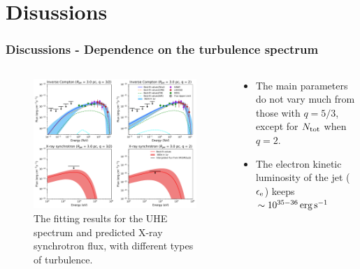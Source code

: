 \documentclass[10pt,aspectratio=169,mathserif]{beamer}
\begin{document}

\section{Disussions}
\begin{frame}
  \frametitle{Discussions - Dependence on the turbulence spectrum}
\begin{columns}[T] %
    \begin{column}{0.5\textwidth} 
      \begin{figure}
        \includegraphics[width=\textwidth]{SYNIC_all_HESS_flat_q=1.pdf}
        \caption{The fitting results for the UHE spectrum and predicted X-ray synchrotron flux, with different types of turbulence.}
        \label{fig:confine}
      \end{figure}
    \end{column}

    \begin{column}{0.5\textwidth} 
    \begin{itemize}
        \item The main parameters do not vary much from those with $q=5/3$,  except for $N_{\rm tot}$ when $q=2$.
        \item The electron kinetic luminosity of the jet ($\epsilon_{\rm e} $) keeps $\sim 10^{35 - 36}\,\rm erg\,s^{-1}$
    \end{itemize}


\end{column}
\end{columns}
\end{frame}
\end{document}
